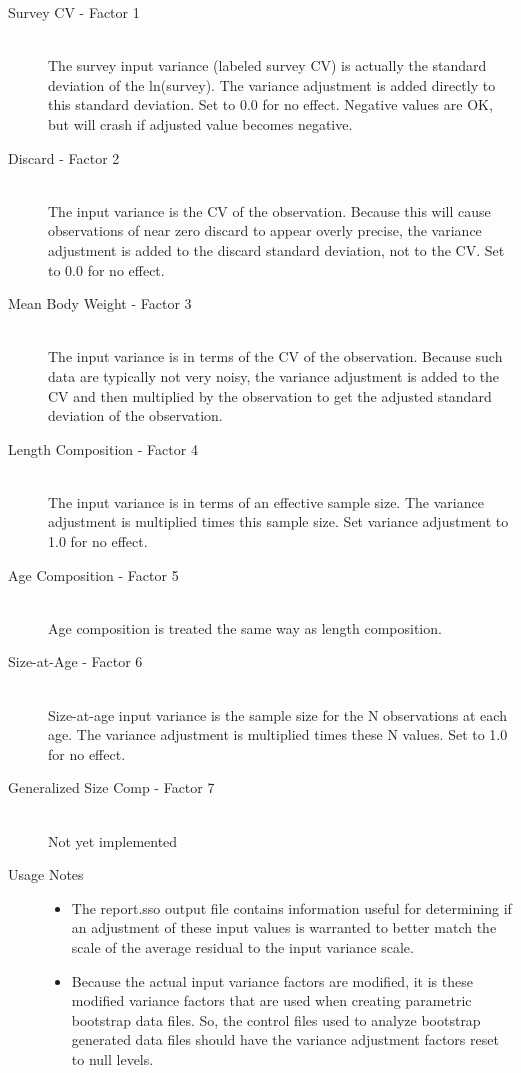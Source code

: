 \begin{description}
	\item[Survey CV - Factor 1]\hfil\\
	The survey input variance (labeled survey CV) is actually the standard deviation of the ln(survey).  The variance adjustment is added directly to this standard deviation.  Set to 0.0 for no effect.  Negative values are OK, but will crash if adjusted value becomes negative.
	\item[Discard - Factor 2]\hfil\\
	The input variance is the CV of the observation.  Because this will cause observations of near zero discard to appear overly precise, the variance adjustment is added to the discard standard deviation, not to the CV.  Set to 0.0 for no effect.
	\item[Mean Body Weight - Factor 3]\hfil\\
	The input variance is in terms of the CV of the observation.  Because such data are typically not very noisy, the variance adjustment is added to the CV and then multiplied by the observation to get the adjusted standard deviation of the observation.
	\item[Length Composition - Factor 4]\hfil\\
	The input variance is in terms of an effective sample size.  The variance adjustment is multiplied times this sample size.  Set variance adjustment to 1.0 for no effect.
	\item[Age Composition - Factor 5]\hfill\\
	Age composition is treated the same way as length composition.
	\item[Size-at-Age - Factor 6]\hfill\\
	Size-at-age input variance is the sample size for the N observations at each age.  The variance adjustment is multiplied times these N values. Set to 1.0 for no effect.
	\item[Generalized Size Comp - Factor 7]\hfill\\
	Not yet implemented
	\item[Usage Notes]\hfill
	\begin{itemize}
		\item The report.sso output file contains information useful for determining if an adjustment of these input values is warranted to better match the scale of the average residual to the input variance scale.
		\item Because the actual input variance factors are modified, it is these modified variance factors that are used when creating parametric bootstrap data files.  So, the control files used to analyze bootstrap generated data files should have the variance adjustment factors reset to null levels.
	\end{itemize}
\end{description}


